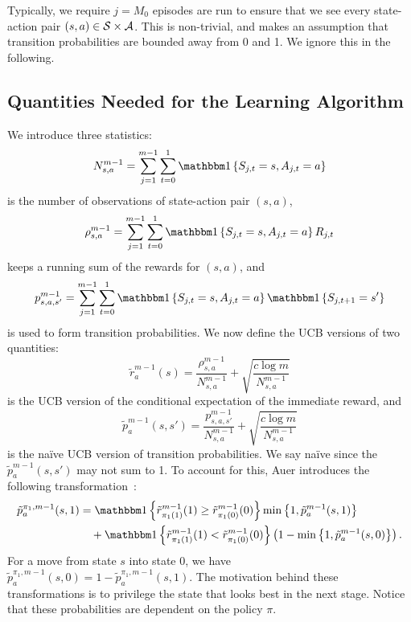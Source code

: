 \documentclass[11pt]{article}
\begin{document}
Typically, we require $j=M_{0}$ episodes are run to ensure that we see every state-action pair $(s,a) \in \mathcal{S}\times\mathcal{A}$. This is non-trivial, and makes an assumption that transition probabilities are bounded away from 0 and 1. We ignore this in the following.

\subsection{Quantities Needed for the Learning Algorithm}

We introduce three statistics:
\begin{equation}
	\label{eq:N_sa}
	N_{s,a}^{m-1} = \sum_{j=1}^{m-1} \sum_{t=0}^{1} \ind\left\{S_{j,t} = s, A_{j,t} = a\right\}
\end{equation}
is the number of observations of state-action pair $(s,a)$,
\begin{equation}
	\label{eq:rho_sa}
	\rho_{s,a}^{m-1} = \sum_{j=1}^{m-1}\sum_{t=0}^{1} \ind\left\{S_{j,t} = s, A_{j,t} = a\right\} R_{j,t}
\end{equation}
keeps a running sum of the rewards for $(s,a)$, and
\begin{equation}
	\label{eq:p_sas}
	p_{s,a,s'}^{m-1} = \sum_{j=1}^{m-1} \sum_{t=0}^{1} \ind\left\{S_{j,t} = s, A_{j,t} = a\right\} \ind\left\{S_{j,t+1} = s'\right\}
\end{equation}
is used to form transition probabilities. We now define the UCB versions of two quantities:
\begin{equation}
	\tilde{r}_{a}^{m-1}(s) = \frac{\rho_{s,a}^{m-1}}{N_{s,a}^{m-1}} + \sqrt{\frac{c\log m}{N_{s,a}^{m-1}}}
\end{equation}
is the UCB version of the conditional expectation of the immediate reward, and
\begin{equation}
	\tilde{p}_{a}^{m-1}(s,s') = \frac{p_{s,a,s'}^{m-1}}{N_{s,a}^{m-1}} + \sqrt{\frac{c\log m}{N_{s,a}^{m-1}}}
\end{equation}
is the na\"{i}ve UCB version of transition probabilities. We say na\"{i}ve since the $\tilde{p}_{a}^{m-1}(s,s')$ may not sum to 1. To account for this, Auer introduces the following transformation~\cite{auer2005online}:
\begin{equation}
	\label{eq:ucb-modified-transition-prob1}
	\begin{split}
		\tilde{p}_{a}^{\pi_1, m-1}(s, 1) &={} \ind\left\{\tilde{r}^{m-1}_{\pi_{1}(1)}(1) \geq \tilde{r}^{m-1}_{\pi_{1}(0)}(0)\right\} \min\left\{1, \tilde{p}^{m-1}_{a}(s,1)\right\} \\
		&\quad + \ind\left\{\tilde{r}^{m-1}_{\pi_{1}(1)}(1) < \tilde{r}^{m-1}_{\pi_{1}(0)}(0)\right\} \left(1 - \min\left\{1, \tilde{p}_{a}^{m-1}(s,0)\right\}\right).
	\end{split}
\end{equation}
For a move from state $s$ into state $0$, we have $\tilde{p}_{a}^{\pi_1, m-1}(s,0) = 1- \tilde{p}_{a}^{\pi_1, m-1}(s,1)$.
The motivation behind these transformations is to privilege the state that looks best in the next stage. Notice that these probabilities are dependent on the policy $\pi$.
\end{document}

